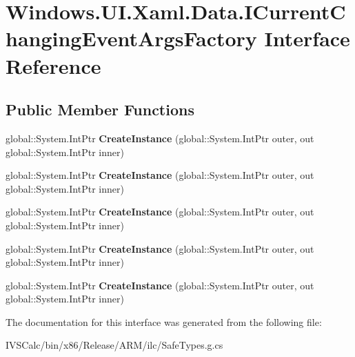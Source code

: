 \hypertarget{interface_windows_1_1_u_i_1_1_xaml_1_1_data_1_1_i_current_changing_event_args_factory}{}\section{Windows.\+U\+I.\+Xaml.\+Data.\+I\+Current\+Changing\+Event\+Args\+Factory Interface Reference}
\label{interface_windows_1_1_u_i_1_1_xaml_1_1_data_1_1_i_current_changing_event_args_factory}
\subsection*{Public Member Functions}
\begin{DoxyCompactItemize}
\item 
\mbox{\label{interface_windows_1_1_u_i_1_1_xaml_1_1_data_1_1_i_current_changing_event_args_factory_a7f8a8b3895a3e16b82790d5cc01dabd5}} 
global\+::\+System.\+Int\+Ptr {\bfseries Create\+Instance} (global\+::\+System.\+Int\+Ptr outer, out global\+::\+System.\+Int\+Ptr inner)
\item 
\mbox{\label{interface_windows_1_1_u_i_1_1_xaml_1_1_data_1_1_i_current_changing_event_args_factory_a7f8a8b3895a3e16b82790d5cc01dabd5}} 
global\+::\+System.\+Int\+Ptr {\bfseries Create\+Instance} (global\+::\+System.\+Int\+Ptr outer, out global\+::\+System.\+Int\+Ptr inner)
\item 
\mbox{\label{interface_windows_1_1_u_i_1_1_xaml_1_1_data_1_1_i_current_changing_event_args_factory_a7f8a8b3895a3e16b82790d5cc01dabd5}} 
global\+::\+System.\+Int\+Ptr {\bfseries Create\+Instance} (global\+::\+System.\+Int\+Ptr outer, out global\+::\+System.\+Int\+Ptr inner)
\item 
\mbox{\label{interface_windows_1_1_u_i_1_1_xaml_1_1_data_1_1_i_current_changing_event_args_factory_a7f8a8b3895a3e16b82790d5cc01dabd5}} 
global\+::\+System.\+Int\+Ptr {\bfseries Create\+Instance} (global\+::\+System.\+Int\+Ptr outer, out global\+::\+System.\+Int\+Ptr inner)
\item 
\mbox{\label{interface_windows_1_1_u_i_1_1_xaml_1_1_data_1_1_i_current_changing_event_args_factory_a7f8a8b3895a3e16b82790d5cc01dabd5}} 
global\+::\+System.\+Int\+Ptr {\bfseries Create\+Instance} (global\+::\+System.\+Int\+Ptr outer, out global\+::\+System.\+Int\+Ptr inner)
\end{DoxyCompactItemize}


The documentation for this interface was generated from the following file\+:\begin{DoxyCompactItemize}
\item 
I\+V\+S\+Calc/bin/x86/\+Release/\+A\+R\+M/ilc/Safe\+Types.\+g.\+cs\end{DoxyCompactItemize}
